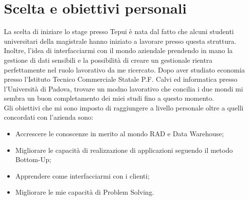\section{Scelta e obiettivi personali}
La scelta di iniziare lo stage presso Tepui è nata dal fatto che alcuni studenti universitari della magistrale hanno iniziato a lavorare presso questa struttura. Inoltre, l'idea di interfacciarmi con il mondo aziendale prendendo in mano la gestione di dati sensibili e la possibilità di creare un gestionale rientra perfettamente nel ruolo lavorativo da me ricercato. Dopo aver studiato economia presso l'Istituto Tecnico Commerciale Statale P.F. Calvi ed informatica presso l'Università di Padova, trovare un modno lavorativo che concilia i due mondi mi sembra un buon completamento dei miei studi fino a questo momento.\\

Gli obiettivi che mi sono imposto di raggiungere a livello personale oltre a quelli concordati con l'azienda sono: 
\begin{itemize}
	\item Accrescere le conoscenze in merito al mondo RAD e Data Warehouse;
	\item Migliorare le capacità di realizzazione di applicazioni seguendo il metodo Bottom-Up;
	\item Apprendere come interfacciarmi con i clienti;
	\item Migliorare le mie capacità di Problem Solving.
\end{itemize}
\newpage
